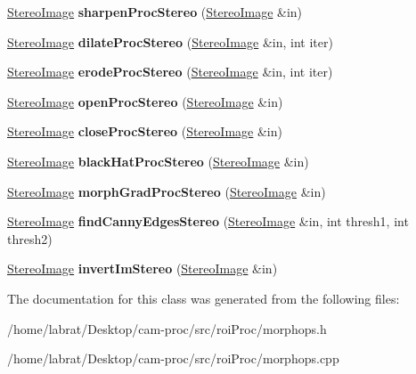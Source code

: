 \begin{DoxyCompactItemize}
\item 
\hyperlink{classStereoImage}{Stereo\+Image} {\bfseries sharpen\+Proc\+Stereo} (\hyperlink{classStereoImage}{Stereo\+Image} \&in)\hypertarget{classMorphOps_afb943d959353aed23c44c9e4093601b6}{}\label{classMorphOps_afb943d959353aed23c44c9e4093601b6}

\item 
\hyperlink{classStereoImage}{Stereo\+Image} {\bfseries dilate\+Proc\+Stereo} (\hyperlink{classStereoImage}{Stereo\+Image} \&in, int iter)\hypertarget{classMorphOps_a4e97a8a1b8c9bf9a13a758b8f2c33d4b}{}\label{classMorphOps_a4e97a8a1b8c9bf9a13a758b8f2c33d4b}

\item 
\hyperlink{classStereoImage}{Stereo\+Image} {\bfseries erode\+Proc\+Stereo} (\hyperlink{classStereoImage}{Stereo\+Image} \&in, int iter)\hypertarget{classMorphOps_ab3864ad3b5e0a2bf91bce74d50ebd745}{}\label{classMorphOps_ab3864ad3b5e0a2bf91bce74d50ebd745}

\item 
\hyperlink{classStereoImage}{Stereo\+Image} {\bfseries open\+Proc\+Stereo} (\hyperlink{classStereoImage}{Stereo\+Image} \&in)\hypertarget{classMorphOps_a6fad306f5c27eff5ce405f430c097f50}{}\label{classMorphOps_a6fad306f5c27eff5ce405f430c097f50}

\item 
\hyperlink{classStereoImage}{Stereo\+Image} {\bfseries close\+Proc\+Stereo} (\hyperlink{classStereoImage}{Stereo\+Image} \&in)\hypertarget{classMorphOps_ac8232d9bf4749fd6cd96998b1226cdcf}{}\label{classMorphOps_ac8232d9bf4749fd6cd96998b1226cdcf}

\item 
\hyperlink{classStereoImage}{Stereo\+Image} {\bfseries black\+Hat\+Proc\+Stereo} (\hyperlink{classStereoImage}{Stereo\+Image} \&in)\hypertarget{classMorphOps_a58d127c08c61c0192d487792dfa8b5f4}{}\label{classMorphOps_a58d127c08c61c0192d487792dfa8b5f4}

\item 
\hyperlink{classStereoImage}{Stereo\+Image} {\bfseries morph\+Grad\+Proc\+Stereo} (\hyperlink{classStereoImage}{Stereo\+Image} \&in)\hypertarget{classMorphOps_adda4744ac9e1dec36bb2010232f28aa7}{}\label{classMorphOps_adda4744ac9e1dec36bb2010232f28aa7}

\item 
\hyperlink{classStereoImage}{Stereo\+Image} {\bfseries find\+Canny\+Edges\+Stereo} (\hyperlink{classStereoImage}{Stereo\+Image} \&in, int thresh1, int thresh2)\hypertarget{classMorphOps_a25345d78872fb006b1c0b9ae0e730220}{}\label{classMorphOps_a25345d78872fb006b1c0b9ae0e730220}

\item 
\hyperlink{classStereoImage}{Stereo\+Image} {\bfseries invert\+Im\+Stereo} (\hyperlink{classStereoImage}{Stereo\+Image} \&in)\hypertarget{classMorphOps_a1ae86e1832c976736197f5296118e0e2}{}\label{classMorphOps_a1ae86e1832c976736197f5296118e0e2}

\end{DoxyCompactItemize}


The documentation for this class was generated from the following files\+:\begin{DoxyCompactItemize}
\item 
/home/labrat/\+Desktop/cam-\/proc/src/roi\+Proc/morphops.\+h\item 
/home/labrat/\+Desktop/cam-\/proc/src/roi\+Proc/morphops.\+cpp\end{DoxyCompactItemize}
